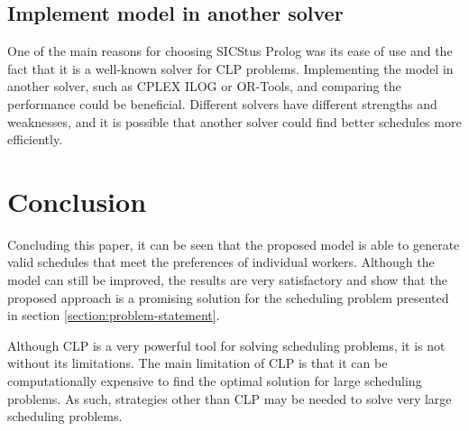 \documentclass[conference]{IEEEtran}
\begin{document}
\subsection*{Implement model in another solver}

One of the main reasons for choosing SICStus Prolog was its ease of use and the fact that it is a well-known solver for CLP problems. 
Implementing the model in another solver, such as CPLEX ILOG or OR-Tools, and comparing the performance could be beneficial. Different solvers have different strengths and weaknesses, and it is possible that another solver could find better schedules more efficiently.

\section{Conclusion}
\label{section:conclusion}

Concluding this paper, it can be seen that the proposed model is able to generate valid schedules that meet the preferences of individual workers. Although the model can still be improved, the results are very satisfactory and show that the proposed approach is a promising solution for the scheduling problem presented in section \ref{section:problem-statement}.

Although CLP is a very powerful tool for solving scheduling problems, it is not without its limitations. The main limitation of CLP is that it can be computationally expensive to find the optimal solution for large scheduling problems.
As such, strategies other than CLP may be needed to solve very large scheduling problems.

% 
% 

\onecolumn
\appendix

\tikzset{
    const plot,
}
\end{document}
